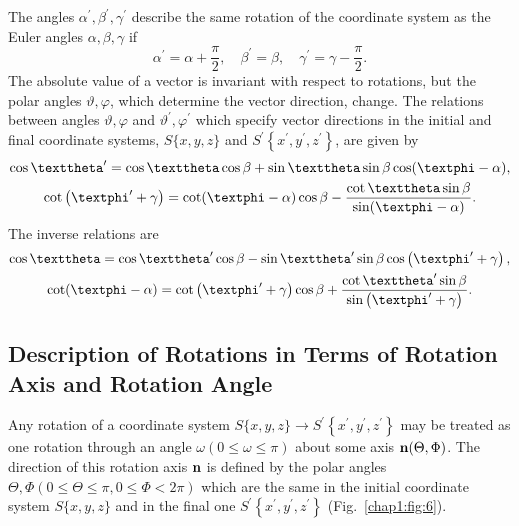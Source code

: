 The angles \(\alpha^{\prime}, \beta^{\prime}, \gamma^{\prime}\) describe the same rotation of the coordinate system as the Euler angles \(\alpha, \beta, \gamma\) if
\begin{equation}
\alpha^{\prime}=\alpha+\frac{\pi}{2}, \quad \beta^{\prime}=\beta, \quad \gamma^{\prime}=\gamma-\frac{\pi}{2} . \label{eq:1:4:1}
\end{equation}
The absolute value of a vector is invariant with respect to rotations, but the polar angles \(\vartheta, \varphi\), which determine the vector direction, change. The relations between angles \(\vartheta, \varphi\) and \(\vartheta^{\prime}, \varphi^{\prime}\) which specify vector directions in the initial and final coordinate systems, \(S\{x, y, z\}\) and \(S^{\prime}\left\{x^{\prime}, y^{\prime}, z^{\prime}\right\}\), are given by
\begin{gather}
\cos \vartheta^{\prime}=\cos \vartheta \cos \beta+\sin \vartheta \sin \beta \cos (\varphi-\alpha) , \notag\\
\cot \left(\varphi^{\prime}+\gamma\right)=\cot (\varphi-\alpha) \cos \beta-\frac{\cot \vartheta \sin \beta}{\sin (\varphi-\alpha)}. \label{eq:1:4:2}
\end{gather}
The inverse relations are
\begin{gather}
\cos \vartheta=\cos \vartheta^{\prime} \cos \beta-\sin \vartheta^{\prime} \sin \beta \cos \left(\varphi^{\prime}+\gamma\right) , \notag\\
\cot (\varphi-\alpha)=\cot \left(\varphi^{\prime}+\gamma\right) \cos \beta+\frac{\cot \vartheta^{\prime} \sin \beta}{\sin \left(\varphi^{\prime}+\gamma\right)} . \label{eq:1:4:3}
\end{gather}
\subsection{Description of Rotations in Terms of Rotation Axis and Rotation Angle}\label{sec:1.4.2}
Any rotation of a coordinate system \(S\{x, y, z\} \rightarrow S^{\prime}\left\{x^{\prime}, y^{\prime}, z^{\prime}\right\}\) may be treated as one rotation through an angle \(\omega(0 \leq \omega \leq \pi)\) about some axis \(\mathbf{n}(\Theta, \Phi)\). The direction of this rotation axis \(\mathbf{n}\) is defined by the polar angles \(\Theta, \Phi(0 \leq \Theta \leq \pi, 0 \leq \Phi<2 \pi)\) which are the same in the initial coordinate system \(S\{x, y, z\}\) and in the final one \(S^{\prime}\left\{x^{\prime}, y^{\prime}, z^{\prime}\right\}\) (Fig.~\ref{chap1:fig:6}).

